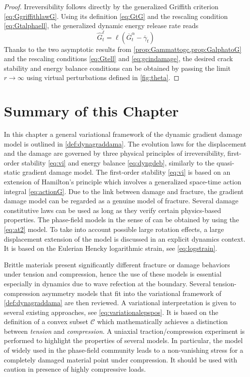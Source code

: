 \begin{proof}
Irreversibility follows directly by the generalized Griffith criterion \eqref{eq:GgriffithlawG}. Using its definition \eqref{eq:GtG} and the rescaling condition \eqref{eq:Gtalphaell}, the generalized dynamic energy release rate reads
\[
\widehat{G}^\ell_t=\ell(\overline{G}_t^\alpha-\overline{\gamma}_t)
\]
Thanks to the two asymptotic results from \cref{prop:Gammattogc,prop:GalphatoG} and the rescaling conditions \eqref{eq:Gtell} and \eqref{eq:gcindamage}, the desired crack stability and energy balance conditions can be obtained by passing the limit $r\to\infty$ using virtual perturbations defined in \cref{fig:theta}.
\end{proof}

\section*{Summary of this Chapter}
In this chapter a general variational framework of the dynamic gradient damage model is outlined in \cref{def:dynagraddama}. The evolution laws for the displacement and the damage are governed by three physical principles of irreversibility, first-order stability \eqref{eq:vi} and energy balance \eqref{eq:dyngdeb}, similarly to the quasi-static gradient damage model. The first-order stability \eqref{eq:vi} is based on an extension of Hamilton's principle which involves a generalized space-time action integral \eqref{eq:actionG}. Due to the link between damage and fracture, the gradient damage model can be regarded as a genuine model of fracture. Several damage constitutive laws can be used as long as they verify certain physics-based properties. The phase-field models in the sense of \cite{MieheHofackerWelschinger:2010,MieheWelschingerHofacker:2010} can be obtained by using the \eqref{eq:at2} model. To take into account possible large rotation effects, a large displacement extension of the model is discussed in an explicit dynamics context. It is based on the Eulerian Hencky logarithmic strain, see \eqref{eq:logstrain}.

Brittle materials present significantly different fracture or damage behaviors under tension and compression, hence the use of these models is essential especially in dynamics due to wave refection at the boundary. Several tension-compression asymmetry models that fit into the variational framework of \cref{def:dynagraddama} are then reviewed. A variational interpretation is given to several existing approaches, see \eqref{eq:variationalepspos}. It is based on the definition of a convex subset $\mathcal{C}$ which mathematically achieves a distinction between \emph{tension} and \emph{compression}. A uniaxial traction/compression experiment is performed to highlight the properties of several models. In particular, the model of \cite{MieheHofackerWelschinger:2010} widely used in the phase-field community leads to a non-vanishing stress for a completely damaged material point under compression. It should be used with caution in presence of highly compressive loads.

